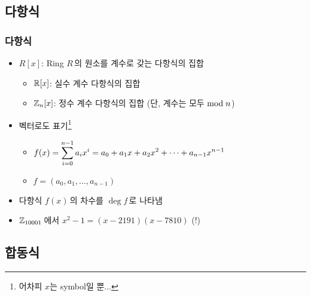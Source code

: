 \subsection*{다항식}

\begin{frame}
    \frametitle{다항식}
    \begin{itemize}
        \setlength{\itemsep}{1em}
        \item \(R[x]\): Ring \(R\)\,의 원소를 계수로 갖는 다항식의 집합
              \smallskip
              \begin{itemize}
                  \item \(\R[x]\): 실수 계수 다항식의 집합
                        \smallskip
                  \item \(\Z_n[x]\): 정수 계수 다항식의 집합 (단, 계수는 모두 \(\rm{mod} \; n\))
              \end{itemize}

        \item<2-> 벡터로도 표기\footnote<2->{어차피 \(x\)는 symbol일 뿐...}
              \smallskip
              \begin{itemize}
                  \item \(f(x) = \ds \sum_{i=0}^{n-1} a_{i}x^i = a_0 + a_1x + a_2x^2 + \cdots + a_{n-1}x^{n-1}\)
                        \smallskip
                  \item \(f = \left(a_0, a_1, \dots, a_{n-1}\right)\)
              \end{itemize}

        \item<3-> 다항식 \(f(x)\)\,의 차수를 \(\deg f\)\,로 나타냄
        \item<4-> \(\Z_{10001}\)\,에서 \(x^2 - 1 = (x - 2191)(x - 7810)\) (!)
    \end{itemize}
\end{frame}

\subsection*{합동식}

